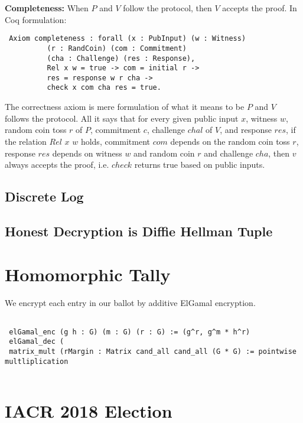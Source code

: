 \begin{Definition}
\noindent
\textbf{Completeness:} When $P$ and $V$ follow the protocol, then $V$ accepts the proof. In Coq formulation:
\begin{verbatim}
 Axiom completeness : forall (x : PubInput) (w : Witness) 
          (r : RandCoin) (com : Commitment) 
          (cha : Challenge) (res : Response),
          Rel x w = true -> com = initial r -> 
          res = response w r cha ->
          check x com cha res = true.
\end{verbatim}

\noindent
The correctness axiom is mere formulation of what it means to be $P$ and $V$ follows the protocol. 
All it says that for every given public input $x$, witness $w$, random coin toss $r$ of $P$, 
commitment $c$, challenge $chal$ of $V$,  and response $res$, if the relation $Rel$ $x$ $w$ holds,
commitment $com$ depends on the random coin toss $r$,  response $res$ depends on 
witness $w$ and random coin $r$ and challenge $cha$, then $v$ always accepts the proof, i.e. 
$check$ returns true based on public inputs. 



\subsection{Discrete Log}
\subsection{Honest Decryption is Diffie Hellman Tuple}

\section{Homomorphic Tally}
We encrypt each entry in our ballot by additive ElGamal encryption. 

\begin{verbatim}
  
 elGamal_enc (g h : G) (m : G) (r : G) := (g^r, g^m * h^r)
 elGamal_dec (
 matrix_mult (rMargin : Matrix cand_all cand_all (G * G) := pointwise multliplication
 
\end{verbatim}



\section{IACR 2018 Election}




\end{Definition}

